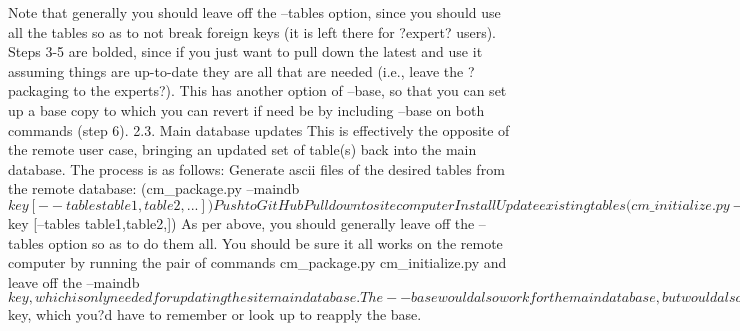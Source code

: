 \documentclass{article}
\begin{document}
Note that generally you should leave off the --tables option, since you should use all the tables so as to not break foreign keys (it is left there for ?expert? users).  Steps 3-5 are bolded, since if you just want to pull down the latest and use it assuming things are up-to-date they are all that are needed (i.e., leave the ?packaging to the experts?).
	This has another option of --base, so that you can set up a base copy to which you can revert if need be by including --base on both commands (step 6).
2.3. Main database updates
This is effectively the opposite of the remote user case, bringing an updated set of table(s) back into the main database.  The process is as follows:
Generate ascii files of the desired tables from the remote database: 
(cm\_package.py --maindb $key [--tables table1,table2,...])
Push to GitHub
Pull down to site computer
Install
Update existing tables 
(cm\_initialize.py --maindb $key [--tables table1,table2,])
As per above, you should generally leave off the --tables option so as to do them all.  You should be sure it all works on the remote computer by running the pair of commands
cm\_package.py
cm\_initialize.py 
and leave off the --maindb $key, which is only needed for updating the site main database.  The --base would also work for the main database, but would also require --maindb $key, which you?d have to remember or look up to reapply the base.
\end{document}
